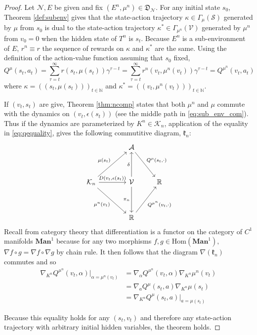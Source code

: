 \documentclass{article} %
\numberwithin{equation}{subsection}
\numberwithin{theorem}{subsection}
\theoremstyle{named}
\def\scriptv{{\mathcal V}}
\def\scripta{{\mathcal A}}
\def\scriptn{{\mathcal N}}
\def\scriptk{{\mathcal K}}
\def\scripts{{\mathcal S}}
\begin{document}
\begin{proof}
  Let $\scriptn, E$ be given and fix $(E^n, \mu^n) \in \mathfrak{D}_\scriptn$.
  For any initial state $s_0$, Theorem  \ref{def:subenv} gives that the state-action trajectory $\kappa \in \Gamma_\mu(\scripts)$ generated by $\mu$ from $s_0$ is dual to the state-action trajectory $\kappa^* \in \Gamma_{\mu^n}(\scriptv)$ generated by $\mu^n$ from $v_0 = 0$ when the hidden state of $T^n$ is $s_t$. Because $E^n$ is a sub-environment of $E$, $r^n \equiv r$ the sequence of rewards on $\kappa$ and $\kappa^*$ are the same. Using the definition of the action-value function assuming that $s_0$ fixed,
  \begin{equation}\label{eq:qequality}
      Q^{\mu}(s_t, a_t) = \sum_{\tau =t}^\infty r(s_t, \mu(s_t)) \gamma^{\tau - t} = \sum_{\tau =t}^\infty r^n(v_t, \mu^n(v_t)) \gamma^{\tau - t} = Q^{\mu^n}(v_t, a_t)
  \end{equation}
  where $\kappa = ((s_t, \mu(s_t)))_{t\in\mathbb{N}}$ and $\kappa^* = ((v_t,\mu^n(v_t)))_{t\in\mathbb{N}}.$



If $(v_t, s_t)$ are give, Theorem \ref{thm:ncomp} states that both $\mu^n$ and $\mu$ commute with the dynamics on $(v_t, \epsilon(s_t))$ (see the middle path in \eqref{eq:sub_env_com}). Thus if the dynamics are parameterized by $K^n \in \scriptk_n$, application of the equality in \eqref{eq:qequality}, gives the following commutitive diagram, $\mathfrak{k}_n$:
  \begin{equation}\label{eq:kparam}
    \begin{tikzcd}
    &[+15pt] \scripta \arrow{rd}{Q^{\mu}(s_t, \cdot)}\\[+18pt]
      \scriptk_n \arrow{r}{D(v_t, \epsilon(s_t))}
            \arrow{rd}[swap]{\mu^n(v_t)}
            \arrow{ru}{\mu(s_t)} & \scriptv \arrow{d}[swap]{\pi_n}\arrow{u}{\delta} & \mathbb{R}\\[+18pt]
      & \mathbb{R} \arrow{ru}[swap]{Q^{\mu^n}(v_t, \cdot)}
    \end{tikzcd}
  \end{equation}
  Recall from category theory that differentiation is a functor on the category of $C^1$ manifolds $\mathrm{\textbf{Man}}^1$ because for any two
  morphisms $f,g \in \mathrm{Hom}(\mathrm{\textbf{Man}}^1),$ $\nabla f \circ g = \nabla f \circ \nabla g$ by chain rule. It then follows that the diagram $\nabla(\mathfrak{k}_n)$ commutes and so
  \begin{equation*}
  \begin{aligned}
    \nabla_{K^n} Q^{\mu^n}(v_t, \alpha) \Big|_{\alpha=\mu^n(v_t)}
    &= \nabla_\alpha Q^{\mu^n}(v_t, \alpha) \nabla_{K^n} \mu^n(v_t) \\
    &=\nabla_a Q^{\mu}(s_t, a) \nabla_{K^n} \mu(s_t) \\
    &=\nabla_{K^n} Q^\mu(s_t, a) \Big|_{a = \mu(s_t)}
  \end{aligned}
  \end{equation*}

  Because this equality holds for any $(s_t, v_t)$ and therefore any state-action trajectory with arbitrary initial hidden variables, the theorem holds.
\end{proof}
\end{document}
